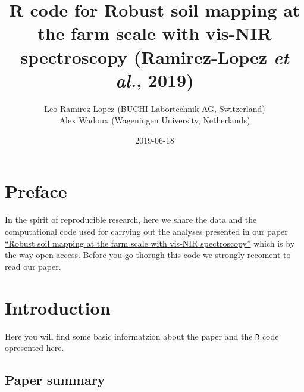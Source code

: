 \documentclass[]{book}
\title{R code for Robust soil mapping at the farm scale with vis-NIR spectroscopy (Ramirez-Lopez \emph{et al.}, 2019)}
\author{Leo Ramirez-Lopez (BUCHI Labortechnik AG, Switzerland) \\ Alex Wadoux (Wageningen University, Netherlands)}
\date{2019-06-18}
\begin{document}
\maketitle

{
\setcounter{tocdepth}{1}
\tableofcontents
}
\hypertarget{preface}{%
\chapter*{Preface}\label{preface}}

In the spirit of reproducible research, here we share the data and the computational code
used for carrying out the analyses presented in our paper \href{https://onlinelibrary.wiley.com/doi/10.1111/ejss.12752}{``Robust soil mapping at the farm scale with vis-NIR spectroscopy''} which is by the way open access. Before you go thorugh this code we strongly recoment to read our paper.

\hypertarget{intro}{%
\chapter{Introduction}\label{intro}}

Here you will find some basic informatzion about the paper and the \texttt{R} code opresented here.

\hypertarget{paper-summary}{%
\section{Paper summary}\label{paper-summary}}
\end{document}
